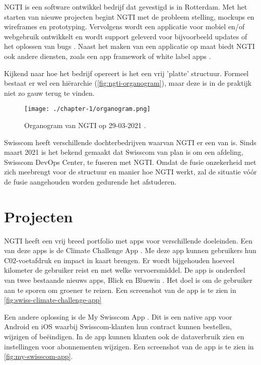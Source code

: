 
NGTI is een software ontwikkel bedrijf dat gevestigd is in Rotterdam. Met het starten van nieuwe projecten begint NGTI met de probleem stelling, mockups en wireframes en prototyping. Vervolgens wordt een applicatie voor mobiel en/of webgebruik ontwikkelt en wordt support geleverd voor bijvoorbeeld updates of het oplossen van bugs \cite{ngti-services}. Naast het maken van een applicatie op maat biedt NGTI ook andere diensten, zoals een app framework of white label apps \cite{ngti-solutions}.

Kijkend naar hoe het bedrijf opereert is het een vrij 'platte' structuur. Formeel bestaat er wel een hiërarchie (\autoref{fig:ngti-organogram}), maar deze is in de praktijk niet zo gauw terug te vinden. 

\begin{figure}[hbt!]
  \centering
  \texttt{[image: ./chapter-1/organogram.png]}
  \caption{Organogram van NGTI op 29-03-2021 \cite{ngti-organogram}.}
  \label{fig:ngti-organogram}
\end{figure}

Swisscom heeft verschillende dochterbedrijven \cite{swisscom-other-division} waarvan NGTI er een van is. Sinds maart 2021 is het bekend gemaakt dat Swisscom van plan is om een afdeling, Swisscom DevOps Center, te fuseren met NGTI. Omdat de fusie onzekerheid met zich meebrengt voor de structuur en manier hoe NGTI werkt, zal de situatie vóór de fusie aangehouden worden gedurende het afstuderen.

\section{Projecten}\label{sec:projecten}
NGTI heeft een vrij breed portfolio met apps voor verschillende doeleinden. Een van deze apps is de Climate Challenge App \cite{ngti-swisscom-climate-challenge}. Me deze app kunnen gebruikers hun C02-voetafdruk en impact in kaart brengen. Er wordt bijgehouden hoeveel kilometer de gebruiker reist en met welke vervoersmiddel. De app is onderdeel van twee bestaande nieuws apps, Blick en Bluewin \cite{swisscom-climate-challenge-integration}. Het doel is om de gebruiker aan te sporen om groener te reizen. Een screenshot van de app is te zien in \autoref{fig:swiss-climate-challenge-app}

Een andere oplossing is de My Swisscom App \cite{ngti-my-swisscom-app}. Dit is een native app voor Android en iOS waarbij Swisscom-klanten hun contract kunnen bestellen, wijzigen of beëindigen. In de app kunnen klanten ook de dataverbruik zien en instellingen voor abonnementen wijzigen. Een screenshot van de app is te zien in \autoref{fig:my-swisscom-app}.

